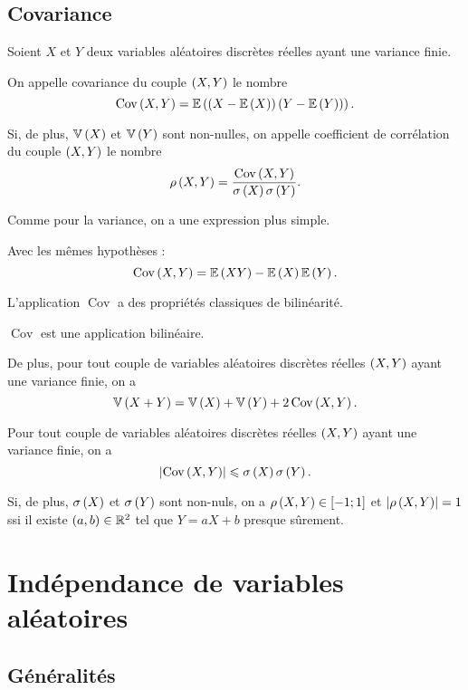\subsection{Covariance}

\begin{defi}
Soient \(X\) et \(Y\) deux variables aléatoires discrètes réelles ayant une variance finie.

On appelle covariance du couple \(\left(X,Y\right)\) le nombre \[\operatorname{Cov}\left(X,Y\right)=\operatorname{\mathbb{E}}\left(\left(X-\operatorname{\mathbb{E}}\left(X\right)\right)\left(Y-\operatorname{\mathbb{E}}\left(Y\right)\right)\right).\]

Si, de plus, \(\operatorname{\mathbb{V}}\left(X\right)\) et \(\operatorname{\mathbb{V}}\left(Y\right)\) sont non-nulles, on appelle coefficient de corrélation du couple \(\left(X,Y\right)\) le nombre \[\operatorname{\rho}\left(X,Y\right)=\dfrac{\operatorname{Cov}\left(X,Y\right)}{\sigma\left(X\right)\sigma\left(Y\right)}.\]
\end{defi}

Comme pour la variance, on a une expression plus simple.

\begin{prop}
Avec les mêmes hypothèses : \[\operatorname{Cov}\left(X,Y\right)=\operatorname{\mathbb{E}}\left(XY\right)-\operatorname{\mathbb{E}}\left(X\right)\operatorname{\mathbb{E}}\left(Y\right).\]
\end{prop}

L'application \(\operatorname{Cov}\) a des propriétés classiques de bilinéarité.

\begin{prop}
\(\operatorname{Cov}\) est une application bilinéaire.

De plus, pour tout couple de variables aléatoires discrètes réelles \(\left(X,Y\right)\) ayant une variance finie, on a \[\operatorname{\mathbb{V}}\left(X+Y\right)=\operatorname{\mathbb{V}}\left(X\right)+\operatorname{\mathbb{V}}\left(Y\right)+2\operatorname{Cov}\left(X,Y\right).\]
\end{prop}

\begin{prop}
Pour tout couple de variables aléatoires discrètes réelles \(\left(X,Y\right)\) ayant une variance finie, on a \[\left\lvert\operatorname{Cov}\left(X,Y\right)\right\rvert\leqslant\sigma\left(X\right)\sigma\left(Y\right).\]

Si, de plus, \(\sigma\left(X\right)\) et \(\sigma\left(Y\right)\) sont non-nuls, on a \(\operatorname{\rho}\left(X,Y\right)\in\left[-1;1\right]\) et \(\left\lvert\operatorname{\rho}\left(X,Y\right)\right\rvert=1\) ssi il existe \(\left(a,b\right)\in\mathbb{R}^2\) tel que \(Y=aX+b\) presque sûrement.
\end{prop}

\section{Indépendance de variables aléatoires}

\subsection{Généralités}

